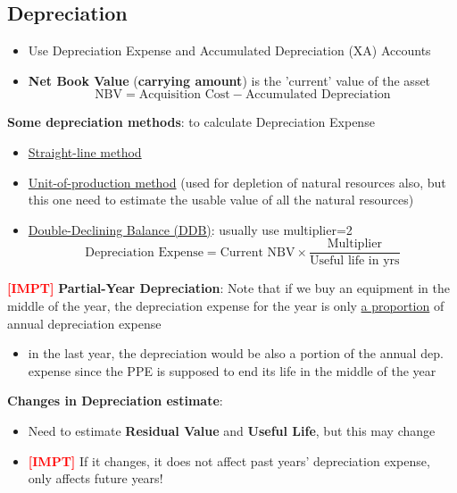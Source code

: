 \documentclass{article}
\newcommand{\impt}[0]{\textcolor{red}{\textbf{[IMPT] }}}
\begin{document}
\begin{multicols}{2}
\subsection{Depreciation}
\begin{itemize}
	\item Use Depreciation Expense and Accumulated Depreciation (XA) Accounts
	\item \textbf{Net Book Value} (\textbf{carrying amount}) is the 'current' value of the asset
	$$\text{NBV} = \text{Acquisition Cost} - \text{Accumulated Depreciation}$$
\end{itemize}
\textbf{Some depreciation methods}: to calculate Depreciation Expense
\begin{itemize}
	\item \underline{Straight-line method}
	\item \underline{Unit-of-production method} (used for depletion of natural resources also, but this one need to estimate the usable value of all the natural resources)
	\item \underline{Double-Declining Balance (DDB)}: usually use multiplier=2
	$$\text{Depreciation Expense} = \text{Current NBV} \times \frac{\text{Multiplier}}{\text{Useful life in yrs}}$$
\end{itemize}
\impt \textbf{Partial-Year Depreciation}: Note that if we buy an equipment in the middle of the year, the depreciation expense for the year is only \underline{a proportion} of annual depreciation expense
\begin{itemize}
	\item in the last year, the depreciation would be also a portion of the annual dep. expense since the PPE is supposed to end its life in the middle of the year
\end{itemize}
\textbf{Changes in Depreciation estimate}:
\begin{itemize}
	\item Need to estimate \textbf{Residual Value} and \textbf{Useful Life}, but this may change
	\item \impt If it changes, it does not affect past years' depreciation expense, only affects future years!
\end{itemize}

\end{multicols}
\end{document}
